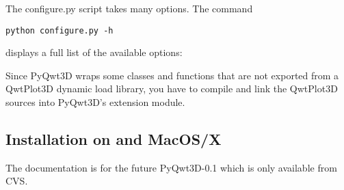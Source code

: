 \documentclass{manual}
\newcommand{\Future}{
  \begin{notice}[warning]
    The documentation is for the future PyQwt3D-0.1 which is only available
    from CVS.
  \end{notice}
}
\begin{document}
\begin{notice}[note]
  The configure.py script takes many options. The command
\begin{verbatim}
python configure.py -h
\end{verbatim}
  displays a full list of the available options:
  
\end{notice}

\begin{notice}[note]
  Since PyQwt3D wraps some classes and functions that are not exported from
  a QwtPlot3D dynamic load library, you have to compile and link the QwtPlot3D
  sources into PyQwt3D's extension module.
\end{notice}


\subsection{Installation on \POSIX{} and MacOS/X\label{posix-install}}

\Future{}
\end{document}
